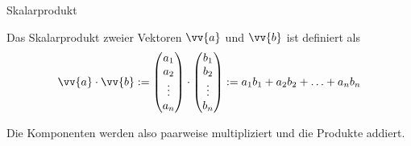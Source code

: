 \begin{frame}{Skalarprodukt}
	\begin{definition}[Skalarprodukt]
		Das Skalarprodukt zweier Vektoren $\vv{a}$ und $\vv{b}$ ist definiert als
		\[
		\vv{a} \cdot \vv{b} := \begin{pmatrix}
		a_1 \\ a_2 \\ \vdots \\ a_n
		\end{pmatrix} \cdot
		\begin{pmatrix}
		b_1 \\ b_2 \\ \vdots \\ b_n
		\end{pmatrix} := a_1 b_1 + a_2 b_2  + \ldots + a_n b_n
		\]
	\end{definition}
	\begin{bemerkung}
		Die Komponenten werden also paarweise multipliziert und die Produkte addiert.
	\end{bemerkung}
\end{frame}


